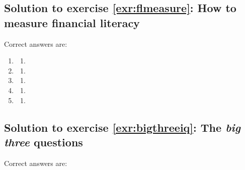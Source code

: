 \documentclass[
  12pt,
  oneside]{book}
\providecommand{\tightlist}{%
  \setlength{\itemsep}{0pt}\setlength{\parskip}{0pt}}
\theoremstyle{definition}
\theoremstyle{definition}
\theoremstyle{definition}
\theoremstyle{definition}
\theoremstyle{remark}
\begin{document}
\hypertarget{sol:flmeasure}{%
\subsection*{Solution to exercise \ref{exr:flmeasure}: How to measure financial literacy}\label{sol:flmeasure}}

Correct answers are:

\begin{enumerate}
\def\labelenumi{\arabic{enumi}.}
\item
  \begin{enumerate}
  \def\labelenumii{\alph{enumii})}
  \setcounter{enumii}{1}
  \tightlist
  \item
  \end{enumerate}
\item
  \begin{enumerate}
  \def\labelenumii{\alph{enumii})}
  \setcounter{enumii}{1}
  \tightlist
  \item
  \end{enumerate}
\item
  \begin{enumerate}
  \def\labelenumii{\alph{enumii})}
  \setcounter{enumii}{1}
  \tightlist
  \item
  \end{enumerate}
\item
  \begin{enumerate}
  \def\labelenumii{\alph{enumii})}
  \tightlist
  \item
  \end{enumerate}
\item
  \begin{enumerate}
  \def\labelenumii{\alph{enumii})}
  \tightlist
  \item
  \end{enumerate}
\end{enumerate}

\hypertarget{sol:bigthreeiq}{%
\subsection*{\texorpdfstring{Solution to exercise \ref{exr:bigthreeiq}: The \emph{big three} questions}{Solution to exercise \ref{exr:bigthreeiq}: The big three questions}}\label{sol:bigthreeiq}}

Correct answers are:
\end{document}
